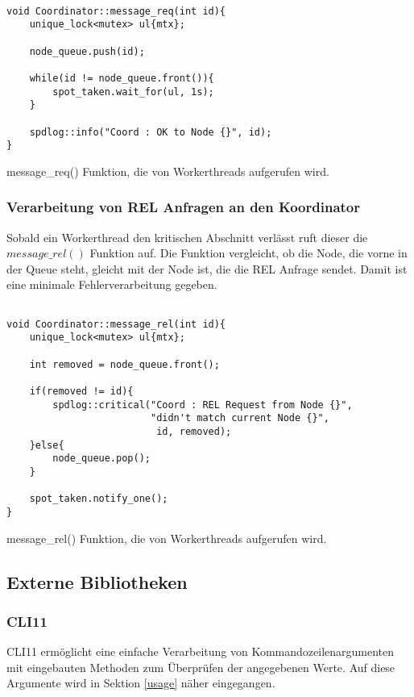 \documentclass[12pt, letterpaper]{article}
\newenvironment{code}{\captionsetup{type=listing}}{}
\begin{document}
\begin{code}
\begin{verbatim}

void Coordinator::message_req(int id){
    unique_lock<mutex> ul{mtx};

    node_queue.push(id);

    while(id != node_queue.front()){
        spot_taken.wait_for(ul, 1s);
    }

    spdlog::info("Coord : OK to Node {}", id);
}

\end{verbatim}
\caption{message\_req() Funktion, die von Workerthreads aufgerufen wird.}
\end{code}

\subsubsection{Verarbeitung von REL Anfragen an den Koordinator}
Sobald ein Workerthread den kritischen Abschnitt verlässt ruft dieser die $message\_rel()$ Funktion auf. 
Die Funktion vergleicht, ob die Node, die vorne in der Queue steht, gleicht mit der Node ist, die die REL Anfrage sendet. Damit ist eine minimale Fehlerverarbeitung gegeben.

\begin{code}
\begin{verbatim}

void Coordinator::message_rel(int id){
    unique_lock<mutex> ul{mtx};

    int removed = node_queue.front();
    
    if(removed != id){
        spdlog::critical("Coord : REL Request from Node {}", 
                         "didn't match current Node {}", 
                          id, removed);
    }else{
        node_queue.pop();
    }

    spot_taken.notify_one();
}

\end{verbatim}
\caption{message\_rel() Funktion, die von Workerthreads aufgerufen wird.}
\end{code}

\subsection{Externe Bibliotheken}
\label{extBib}

\subsubsection{CLI11}
CLI11\cite{cli11_ref} ermöglicht eine einfache Verarbeitung von Kommandozeilenargumenten mit eingebauten Methoden zum Überprüfen der angegebenen Werte. Auf diese Argumente wird in Sektion \ref{usage} näher eingegangen.
\end{document}
